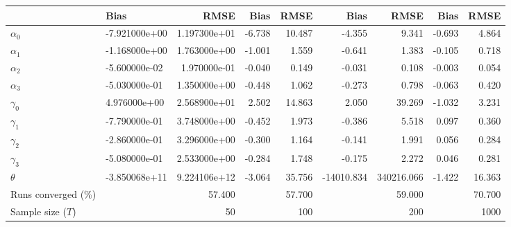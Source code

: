 
\begin{tabular}[t]{llrrrrrrr}
\toprule
  & Bias & RMSE & Bias & RMSE & Bias & RMSE & Bias & RMSE\\
\midrule
$\alpha_{0}$ & -7.921000e+00 & 1.197300e+01 & -6.738 & 10.487 & -4.355 & 9.341 & -0.693 & 4.864\\
$\alpha_{1}$ & -1.168000e+00 & 1.763000e+00 & -1.001 & 1.559 & -0.641 & 1.383 & -0.105 & 0.718\\
$\alpha_{2}$ & -5.600000e-02 & 1.970000e-01 & -0.040 & 0.149 & -0.031 & 0.108 & -0.003 & 0.054\\
$\alpha_{3}$ & -5.030000e-01 & 1.350000e+00 & -0.448 & 1.062 & -0.273 & 0.798 & -0.063 & 0.420\\
$\gamma_{0}$ & 4.976000e+00 & 2.568900e+01 & 2.502 & 14.863 & 2.050 & 39.269 & -1.032 & 3.231\\
$\gamma_{1}$ & -7.790000e-01 & 3.748000e+00 & -0.452 & 1.973 & -0.386 & 5.518 & 0.097 & 0.360\\
$\gamma_{2}$ & -2.860000e-01 & 3.296000e+00 & -0.300 & 1.164 & -0.141 & 1.991 & 0.056 & 0.284\\
$\gamma_{3}$ & -5.080000e-01 & 2.533000e+00 & -0.284 & 1.748 & -0.175 & 2.272 & 0.046 & 0.281\\
$\theta$ & -3.850068e+11 & 9.224106e+12 & -3.064 & 35.756 & -14010.834 & 340216.066 & -1.422 & 16.363\\
Runs converged (\%) &  & 57.400 &  & 57.700 &  & 59.000 &  & 70.700\\
Sample size ($T$) &  & 50 &  & 100 &  & 200 &  & 1000\\
\bottomrule
\end{tabular}
